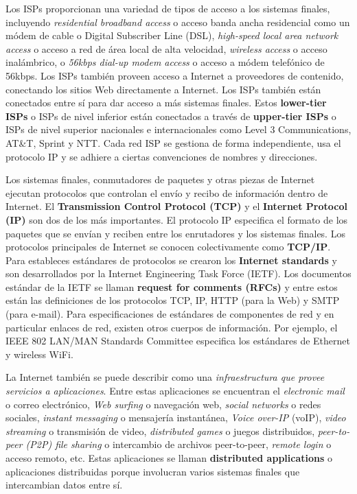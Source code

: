 Los ISPs proporcionan una variedad de tipos de acceso a los sistemas finales, incluyendo \textit{residential broadband access} o acceso banda ancha residencial como un módem de cable o Digital Subscriber Line (DSL), \textit{high-speed local area network access} o acceso a red de área local de alta velocidad, \textit{wireless access} o acceso inalámbrico, o \textit{56kbps dial-up modem access} o acceso a módem telefónico de 56kbps. Los ISPs también proveen acceso a Internet a proveedores de contenido, conectando los sitios Web directamente a Internet. Los ISPs también están conectados entre sí para dar acceso a más sistemas finales. Estos \textbf{lower-tier ISPs} o ISPs de nivel inferior están conectados a través de \textbf{upper-tier ISPs} o ISPs de nivel superior nacionales e internacionales como Level 3 Communications, AT\&T, Sprint y NTT. Cada red ISP se gestiona de forma independiente, usa el protocolo IP y se adhiere a ciertas convenciones de nombres y direcciones.
\bigskip

Los sistemas finales, conmutadores de paquetes y otras piezas de Internet ejecutan protocolos que controlan el envío y recibo de información dentro de Internet. El \textbf{Transmission Control Protocol (TCP)} y el \textbf{Internet Protocol (IP)} son dos de los más importantes. El protocolo IP especifica el formato de los paquetes que se envían y reciben entre los enrutadores y los sistemas finales. Los protocolos principales de Internet se conocen colectivamente como \textbf{TCP/IP}. Para estableces estándares de protocolos se crearon los \textbf{Internet standards} y son desarrollados por la Internet Engineering Task Force (IETF). Los documentos estándar de la IETF se llaman \textbf{request for comments (RFCs)} y entre estos están las definiciones de los protocolos TCP, IP, HTTP (para la Web) y SMTP (para e-mail). Para especificaciones de estándares de componentes de red y en particular enlaces de red, existen otros cuerpos de información. Por ejemplo, el IEEE 802 LAN/MAN Standards Committee especifica los estándares de Ethernet y wireless WiFi.
\bigskip

La Internet también se puede describir como una \textit{infraestructura que provee servicios a aplicaciones}. Entre estas aplicaciones se encuentran el \textit{electronic mail} o correo electrónico, \textit{Web surfing} o navegación web, \textit{social networks} o redes sociales, \textit{instant messaging} o mensajería instantánea, \textit{Voice over-IP} (voIP), \textit{video streaming} o transmisión de video, \textit{distributed games} o juegos distribuidos, \textit{peer-to-peer (P2P) file sharing} o intercambio de archivos peer-to-peer, \textit{remote login} o acceso remoto, etc. Estas aplicaciones se llaman \textbf{distributed applications} o aplicaciones distribuidas porque involucran varios sistemas finales que intercambian datos entre sí.
\bigskip

